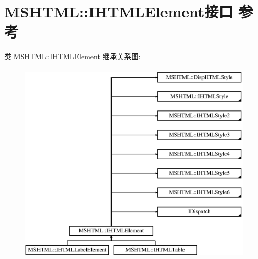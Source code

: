 \hypertarget{interface_m_s_h_t_m_l_1_1_i_h_t_m_l_element}{}\section{M\+S\+H\+T\+ML\+:\+:I\+H\+T\+M\+L\+Element接口 参考}
\label{interface_m_s_h_t_m_l_1_1_i_h_t_m_l_element}
类 M\+S\+H\+T\+ML\+:\+:I\+H\+T\+M\+L\+Element 继承关系图\+:\begin{figure}[H]
\begin{center}
\leavevmode
\includegraphics[height=9.773124cm]{interface_m_s_h_t_m_l_1_1_i_h_t_m_l_element}
\end{center}
\end{figure}
